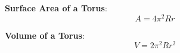 \documentclass{article}
\begin{document}
            \noindent \color{purple} \textbf{Surface Area of a Torus}: \color{black} \\

            \begin{equation*}
                A = 4 {\pi}^2 Rr
            \end{equation*}

            \noindent \color{purple} \textbf{Volume of a Torus}: \color{black} \\

            \begin{equation*}
                V = 2 {\pi}^2 Rr^2
            \end{equation*}
\end{document}
